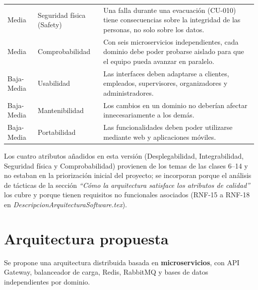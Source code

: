 \documentclass[12pt,a4paper]{article}
\begin{document}
\begin{longtable}{p{2cm}p{3cm}p{9cm}}
Media & Seguridad física (Safety) & Una falla durante una evacuación (CU-010) tiene consecuencias sobre la integridad de las personas, no solo sobre los datos.\\
Media & Comprobabilidad & Con seis microservicios independientes, cada dominio debe poder probarse aislado para que el equipo pueda avanzar en paralelo.\\
Baja-Media & Usabilidad & Las interfaces deben adaptarse a clientes, empleados, supervisores, organizadores y administradores.\\
Baja-Media & Mantenibilidad & Los cambios en un dominio no deberían afectar innecesariamente a los demás.\\
Baja-Media & Portabilidad & Las funcionalidades deben poder utilizarse mediante web y aplicaciones móviles.\\
\bottomrule
\end{longtable}

Los cuatro atributos añadidos en esta versión (Desplegabilidad, Integrabilidad, Seguridad física
y Comprobabilidad) provienen de los temas de las clases 6--14 y no estaban en la priorización
inicial del proyecto; se incorporan porque el análisis de tácticas de la sección
\textit{``Cómo la arquitectura satisface los atributos de calidad''} los cubre y porque tienen
requisitos no funcionales asociados (RNF-15 a RNF-18 en \textit{DescripcionArquitecturaSoftware.tex}).

\section{Arquitectura propuesta}

Se propone una arquitectura distribuida basada en \textbf{microservicios}, con API Gateway, balanceador de carga, Redis, RabbitMQ y bases de datos independientes por dominio.
\end{document}
